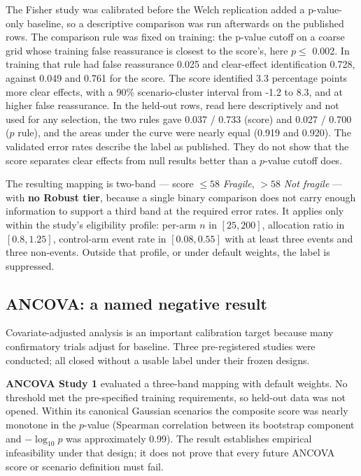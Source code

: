 The Fisher study was calibrated before the Welch replication added a
p-value-only baseline, so a descriptive comparison was run afterwards on the
published rows. The comparison rule was fixed on training: the p-value cutoff on
a coarse grid whose training false reassurance is closest to the score's, here
\(p \le\) 0.002. In training that rule had false reassurance
0.025 and clear-effect identification
0.728, against
0.049 and
0.761 for the score. The score
identified 3.3 percentage points
more clear effects, with a 90\% scenario-cluster interval from
-1.2 to 8.3,
and at higher false reassurance. In the held-out rows, read here descriptively
and not used for any selection, the two rules gave
0.037 / 0.733
(score) and 0.027 / 0.700
(\(p\) rule), and the areas under the curve were nearly equal
(0.919 and 0.920). The
validated error rates describe the label as published. They do not show that the
score separates clear effects from null results better than a \(p\)-value cutoff
does.

The resulting mapping is two-band --- score \(\leq 58\) \emph{Fragile}, \(> 58\)
\emph{Not fragile} --- with \textbf{no Robust tier}, because a single binary comparison
does not carry enough information to support a third band at the required
error rates. It applies only within the study's eligibility profile: per-arm
\(n\) in \([25, 200]\), allocation ratio in \([0.8, 1.25]\), control-arm event rate
in \([0.08, 0.55]\) with at least three events and three non-events. Outside
that profile, or under default weights, the label is suppressed.

\subsection{ANCOVA: a named negative result}\label{ancova-a-named-negative-result}

Covariate-adjusted analysis is an important calibration target because many
confirmatory trials adjust for baseline. Three pre-registered studies were
conducted; all closed without a usable label under their frozen designs.

\textbf{ANCOVA Study 1} evaluated a three-band mapping with default weights. No
threshold met the pre-specified training requirements, so held-out data was
not opened. Within its canonical Gaussian scenarios the composite score was
nearly monotone in the \(p\)-value (Spearman correlation between its bootstrap
component and \(-\log_{10}p\) was approximately 0.99). The result establishes
empirical infeasibility under that design; it does not prove that every future
ANCOVA score or scenario definition must fail.

